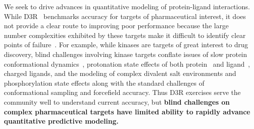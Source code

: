 \documentclass[11pt]{article}
\begin{document}
We seek to drive advances in quantitative modeling of protein-ligand interactions.
While D3R~\cite{Gathiaka:2016:JComputAidedMolDes} benchmarks accuracy for targets of pharmaceutical interest, it does not provide a clear route to improving poor performance because the large number complexities exhibited by these targets make it difficult to identify clear points of failure~\cite{ignjatovic_binding-affinity_2016, deng_large_2016, sunseri_d3r_2016, Gathiaka:2016:JComputAidedMolDes}.
For example, while kinases are targets of great interest to drug discovery, blind challenges involving kinase targets conflate issues of slow protein conformational dynamics~\cite{Lin:2013:Proc.Natl.Acad.Sci.}, protonation state effects of both protein~\cite{Shan:2009:PNAS} and ligand~\cite{Szakacs:2005:JournalofMedicinalChemistry,Grante:2014:SpectrochimicaActaPartA:MolecularandBiomolecularSpectroscopy}, charged ligands, and the modeling of complex divalent salt environments and phosphorylation state effects along with the standard challenges of conformational sampling and forcefield accuracy.
Thus D3R exercises serve the community well to understand current accuracy, but {\bf blind challenges on complex pharmaceutical targets have limited ability to rapidly advance quantitative predictive modeling.}
\end{document}
